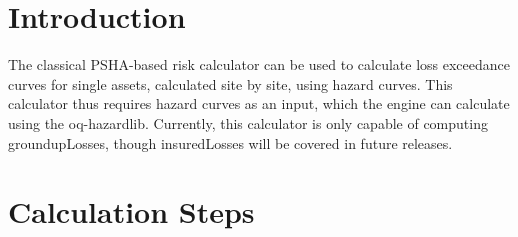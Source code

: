 \section{Introduction}
The classical PSHA-based risk calculator can be used to calculate loss exceedance curves for single \glspl{asset}, calculated site by site, using hazard curves. This calculator thus requires hazard curves as an input, which the engine can calculate using the oq-hazardlib. Currently, this calculator is only capable of computing \gls{groundupLosses}, though \gls{insuredLosses} will be covered in future releases.

\section{Calculation Steps}

